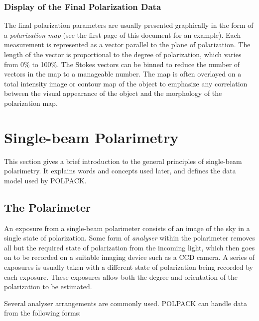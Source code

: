 \documentclass[twoside,11pt]{article}
\newcommand{\xlabel}[1]{}
\renewcommand{\_}{\texttt{\symbol{95}}}
\begin{document}
\subsubsection{Display of the Final Polarization Data}
The final polarization parameters are usually presented graphically in
the form of a \emph{polarization map} (see the first page of this document
for an example). Each measurement is represented as a vector parallel to
the plane of polarization. The length of the vector is proportional to
the degree of polarization, which varies from 0\% to 100\%. The Stokes
vectors can be binned to reduce the number of vectors in the map to a
manageable number. The map is often overlayed on a total intensity image
or contour map of the object to emphasize any correlation between the
visual appearance of the object and the morphology of the polarization
map.

\section{\label{SEC:SBPOL}\xlabel{singlebeampolarimetry}Single-beam Polarimetry}
This section gives a brief introduction to the general principles of
single-beam polarimetry. It explains words and concepts used later, and
defines the data model used by POLPACK. 

\subsection{\label{SEC:SBPOLARIM}The Polarimeter}
An exposure from a single-beam polarimeter consists of an image of the sky 
in a single state of polarization. Some form of \emph{analyser} within
the polarimeter removes all but the required state of polarization from
the incoming light, which then goes on to be recorded on a suitable
imaging device such as a CCD camera. A series of exposures is usually taken
with a different state of polarization being recorded by each exposure.
These exposures allow both the degree and orientation of the polarization
to be estimated.

Several analyser arrangements are commonly used. POLPACK can handle data 
from the following forms:
\end{document}
